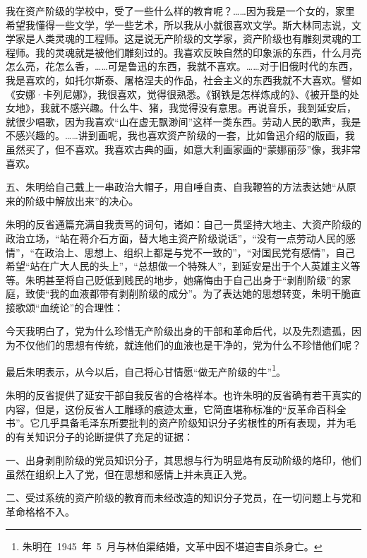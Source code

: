 \begin{quoting}
我在资产阶级的学校中，受了一些什么样的教育呢？……因为我是一个女的，家里希望我懂得一些文学，学一些艺术，所以我从小就很喜欢文学。斯大林同志说，文学家是人类灵魂的工程师。这是说无产阶级的文学家，资产阶级也有雕刻灵魂的工程师。我的灵魂就是被他们雕刻过的。我喜欢反映自然的印象派的东西，什么月亮怎么亮，花怎么香，……可是鲁迅的东西，我就不喜欢。……对于旧俄时代的东西，我是喜欢的，如托尔斯泰、屠格涅夫的作品，社会主义的东西我就不大喜欢。譬如《安娜·卡列尼娜》，我很喜欢，觉得很熟悉。《钢铁是怎样炼成的》、《被开垦的处女地》，我就不感兴趣。什么牛、猪，我觉得没有意思。再说音乐，我到延安后，就很少唱歌，因为我喜欢“山在虚无飘渺间”这样一类东西。劳动人民的歌声，我是不感兴趣的。……讲到画呢，我也喜欢资产阶级的一套，比如鲁迅介绍的版画，我虽然买了，但不喜欢。我喜欢古典的画，如意大利画家画的“蒙娜丽莎”像，我非常喜欢。
\end{quoting}

五、朱明给自己戴上一串政治大帽子，用自唾自责、自我鞭笞的方法表达她“从原来的阶级中解放出来”的决心。

朱明的反省通篇充满自我责骂的词句，诸如：自己一贯坚持大地主、大资产阶级的政治立场，“站在蒋介石方面，替大地主资产阶级说话”，“没有一点劳动人民的感情”，“在政治上、思想上、组织上都是与党不一致的”，“对国民党有感情”，自己希望“站在广大人民的头上”，“总想做一个特殊人”，到延安是出于个人英雄主义等等。朱明甚至将自己贬低到贱民的地步，她痛悔由于自己出身于“剥削阶级”的家庭，致使“我的血液都带有剥削阶级的成分”。为了表达她的思想转变，朱明干脆直接歌颂“血统论”的合理性：

\begin{quoting}
今天我明白了，党为什么珍惜无产阶级出身的干部和革命后代，以及先烈遗孤，因为不仅他们的思想有传统，就连他们的血液也是干净的，党为什么不珍惜他们呢？
\end{quoting}

最后朱明表示，从今以后，自己将心甘情愿“做无产阶级的牛”\footnote{朱明在~1945~年~5~月与林伯渠结婚，文革中因不堪迫害自杀身亡。}。

朱明的反省提供了延安干部自我反省的合格样本。也许朱明的反省确有若干真实的内容，但是，这份反省人工雕琢的痕迹太重，它简直堪称标准的“反革命百科全书”。它几乎具备毛泽东所要批判的资产阶级知识分子劣根性的所有表现，并为毛的有关知识分子的论断提供了充足的证据：

一、出身剥削阶级的党员知识分子，其思想与行为明显烙有反动阶级的烙印，他们虽然在组织上入了党，但在思想和感情上并未真正入党。

二、受过系统的资产阶级的教育而未经改造的知识分子党员，在一切问题上与党和革命格格不入。

